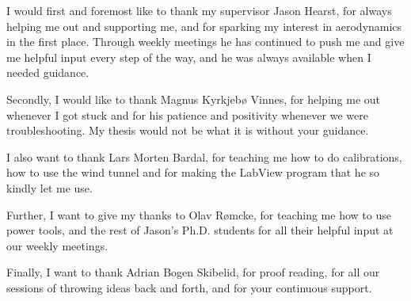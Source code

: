 I would first and foremost like to thank my supervisor Jason Hearst, for always helping me out and supporting me, and for sparking my interest in aerodynamics in the first place. Through weekly meetings he has continued to push me and give me helpful input every step of the way, and he was always available when I needed guidance.  

Secondly, I would like to thank Magnus Kyrkjebø Vinnes, for helping me out whenever I got stuck and for his patience and positivity whenever we were troubleshooting. My thesis would not be what it is without your guidance. 

I also want to thank Lars Morten Bardal, for teaching me how to do calibrations, how to use the wind tunnel and for making the LabView program that he so kindly let me use.  

Further, I want to give my thanks to Olav Rømcke, for teaching me how to use power tools, and the rest of Jason's Ph.D. students for all their helpful input at our weekly meetings.  

Finally, I want to thank Adrian Bogen Skibelid, for proof reading, for all our sessions of throwing ideas back and forth, and for your continuous support.   
